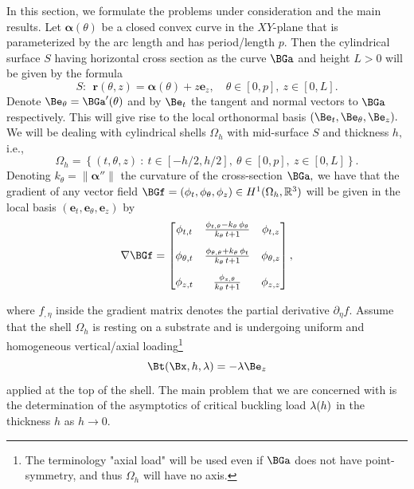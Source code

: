 In this section, we formulate the problems under consideration and the main results. Let $\bm\alpha(\theta)$ be a closed convex curve in the $XY$-plane that is parameterized by the arc length and has period/length $p$. Then the cylindrical surface $S$ having horizontal cross section as the curve $\BGa$ and height $L>0$ will be given by the formula 
$$S: \ \ \bm{r}(\theta,z)=\bm\alpha(\theta)+z\bm{e}_z,\quad  \theta\in[0,p],\  z\in[0,L].$$
Denote $\Be_\Gth=\BGa'(\Gth)$ and by $\Be_t$ the tangent and normal vectors to $\BGa$ respectively. This will give rise to the local orthonormal basis 
$(\Be_t,\Be_\Gth,\Be_z).$ We will be dealing with cylindrical shells $\Omega_h$ with mid-surface $S$ and thickness $h,$ i.e., 
\begin{equation}
\label{3.1}
\Omega_{h}=\left\{(t, \theta, z) \ : \ t \in [-h/2,h/2], \ \theta \in[0, p], \ z \in[0, L]\right\}.
\end{equation}
Denoting $k_\theta=\|\bm\alpha''\|$ the curvature of the cross-section $\BGa,$ we have that the gradient of any vector field 
$\BGf=(\phi_t,\phi_\Gth,\phi_z)\in H^1(\Omega_h,\mathbb R^3)$ will be given in the local basis $(\bm{e}_t,\bm{e}_\theta,\bm{e}_z)$ by 
\begin{equation}
\label{3.2}
\nabla \BGf
=\begin{bmatrix}
\phi_{t,t} & \frac{\phi_{t,\theta}-k_{\theta }\,\phi_\theta}{k_{\theta }\,t+1} & \phi_{t,z} \\[10pt]
\phi_{\theta,t} & \frac{\phi_{\theta,\theta}+k_{\theta }\,\phi_t}{k_{\theta }\,t+1} & \phi_{\theta,z}\\[10pt] 
\phi_{z,t} & \frac{\phi_{z,\theta}}{k_{\theta }\,t+1} & \phi_{z,z} 
\end{bmatrix},
\end{equation}


where $f_{,\eta}$ inside the gradient matrix denotes the partial derivative $\partial_\eta f.$ Assume that the shell $\Omega_h$ is resting on a substrate and is undergoing uniform and homogeneous vertical/axial loading\footnote{The terminology "axial load" will be used even if $\BGa$ does not have point-symmetry, and thus $\Omega_h$ will have no axis.} 
\begin{equation}
\label{3.3}
\Bt(\Bx,h,\lambda)=-\lambda \Be_z
\end{equation}
applied at the top of the shell. The main problem that we are concerned with is the determination of the asymptotics of critical buckling load $\lambda(h)$ in the thickness $h$ as $h\to 0.$ 

